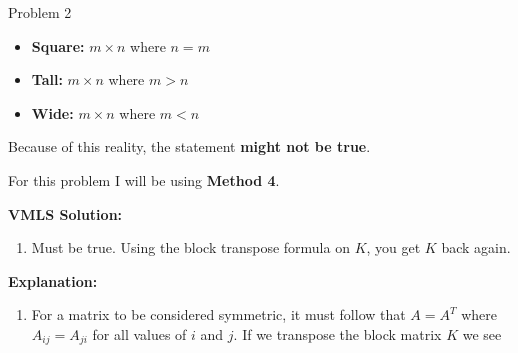 \begin{problem}{Problem 2}
\begin{Highlight}
\begin{enumerate}[label = (\alph*), start = 2]
            \begin{itemize}
                \item \textbf{Square:} $m \times n$ where $n = m$
                \item \textbf{Tall:} $m \times n$ where $m > n$
                \item \textbf{Wide:} $m \times n$ where $m < n$
            \end{itemize}
            Because of this reality, the statement \textbf{might not be true}.
        \end{enumerate}
    \end{Highlight}

    \begin{Highlight}
        For this problem I will be using \textbf{Method 4}. \vspace*{1em}

        \noindent \textbf{VMLS Solution:}

        \begin{enumerate}[label = (\alph*), start = 3]
            \item Must be true. Using the block transpose formula on $K$, you get $K$ back again.
        \end{enumerate}

        \noindent \textbf{Explanation:}

        \begin{enumerate}[label = (\alph*), start = 3]
            \item For a matrix to be considered symmetric, it must follow that $A = A^{T}$ where $A_{ij} = A_{ji}$ for all values of $i$ and $j$. If we transpose the block matrix $K$ we see
            

\end{enumerate}
\end{Highlight}
\end{problem}
